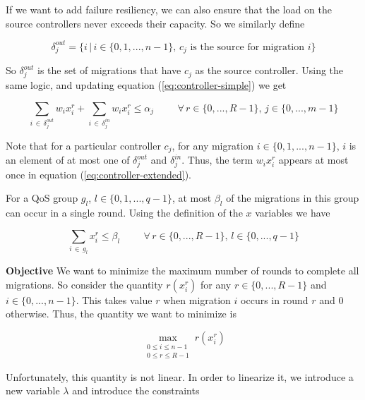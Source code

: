 \documentclass[letterpaper,12pt,titlepage,oneside,final]{article}
\begin{document}
If we want to add failure resiliency, we can also ensure that the load on the source controllers never exceeds their capacity. So we similarly define

$$\delta^{out}_{j} = \{i \, | \, i \in \{0, 1, ..., n-1\}, \, c_{j} \text{ is the source for migration } i\}$$

So $\delta^{out}_{j}$ is the set of migrations that have $c_{j}$ as the source controller. Using the same logic, and updating equation (\ref{eq:controller-simple}) we get

\begin{equation}\label{eq:controller-extended}
    \sum_{i \, \in \, \delta^{out}_{j}} w_{i}x^{r}_{i} + \sum_{i \, \in \, \delta^{in}_{j}} w_{i}x^{r}_{i} \leq \alpha_{j} \hspace{1cm} \forall \, r \in \{0, ..., R-1\}, \, j \in \{0, ..., m-1\}
\end{equation}

Note that for a particular controller $c_{j}$, for any migration $i \in \{0, 1, ..., n-1\}$, $i$ is an element of at most one of $\delta^{out}_{j}$ and $\delta^{in}_{j}$. Thus, the term $w_{i}x^{r}_{i}$ appears at most once in equation (\ref{eq:controller-extended}).

\noindent For a QoS group $g_{l}$, $l \in \{0, 1, ..., q-1\}$, at most $\beta_{l}$ of the migrations in this group can occur in a single round. Using the definition of the $x$ variables we have

\begin{equation}\label{eq:qos-constraint}
    \sum_{i \, \in \, g_{l}} x^{r}_{i} \leq \beta_{l} \hspace{1cm} \forall \, r \in \{0, ..., R - 1\}, \, l \in \{0, ..., q-1\}
\end{equation}

\noindent\textbf{Objective}\newline
We want to minimize the maximum number of rounds to complete all migrations. So consider the quantity $r(x^{r}_{i})$ for any $r \in \{0, ..., R - 1\}$ and $i \in \{0, ..., n - 1\}$. This takes value $r$ when migration $i$ occurs in round $r$ and 0 otherwise. Thus, the quantity we want to minimize is

$$\max_{\substack{0 \leq i \leq n - 1 \\ 0 \leq r \leq R - 1}} r(x^{r}_{i})$$

Unfortunately, this quantity is not linear. In order to linearize it, we introduce a new variable $\lambda$ and introduce the constraints
\end{document}
